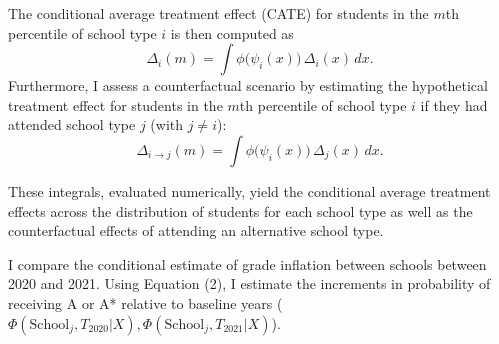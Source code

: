 The conditional average treatment effect (CATE) for students in the \(m\)th percentile of school type \(i\) is then computed as
\[
\Delta_i(m) = \int \phi\bigl(\psi_i(x)\bigr)\,\Delta_i(x)\,dx.
\]
Furthermore, I assess a counterfactual scenario by estimating the hypothetical treatment effect for students in the \(m\)th percentile of school type \(i\) if they had attended school type \(j\) (with \(j\neq i\)):
\[
\Delta_{i\to j}(m) = \int \phi\bigl(\psi_i(x)\bigr)\,\Delta_j(x)\,dx.
\]

These integrals, evaluated numerically, yield the conditional average treatment effects across the distribution of students for each school type as well as the counterfactual effects of attending an alternative school type.


I compare the conditional estimate of grade inflation between schools between 2020 and 2021. Using Equation (2), I estimate the increments in probability of receiving A or A* relative to baseline years ($\Phi(\text{School}_j, T_{2020}|X), \Phi(\text{School}_j, T_{2021}|X)$).
